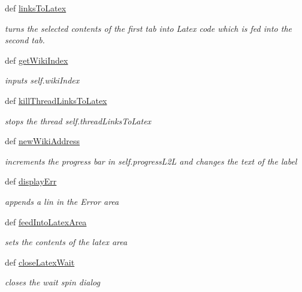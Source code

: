 \begin{DoxyCompactItemize}
def \hyperlink{classuicilibris_1_1w2mMainWindow_a1cfdfd4a9daf1a27d3d7f29cacb9f757}{links\-To\-Latex}
\begin{DoxyCompactList}\small\item\em turns the selected contents of the first tab into \-Latex code which is fed into the second tab. \end{DoxyCompactList}\item 
def \hyperlink{classuicilibris_1_1w2mMainWindow_a6717d417cd86ab78b4428a14b5ad4b0c}{get\-Wiki\-Index}
\begin{DoxyCompactList}\small\item\em inputs self.\-wiki\-Index \end{DoxyCompactList}\item 
def \hyperlink{classuicilibris_1_1w2mMainWindow_a3b1c79851802ee6bf2d49d77f779039f}{kill\-Thread\-Links\-To\-Latex}
\begin{DoxyCompactList}\small\item\em stops the thread self.\-thread\-Links\-To\-Latex \end{DoxyCompactList}\item 
def \hyperlink{classuicilibris_1_1w2mMainWindow_a1be02f4f12b50e5ebcd6ecc8f4d9a532}{new\-Wiki\-Address}
\begin{DoxyCompactList}\small\item\em increments the progress bar in self.\-progress\-L2\-L and changes the text of the label \end{DoxyCompactList}\item 
def \hyperlink{classuicilibris_1_1w2mMainWindow_a4f683d705e901227efacd4d3b59da2d7}{display\-Err}
\begin{DoxyCompactList}\small\item\em appends a lin in the \-Error area \end{DoxyCompactList}\item 
def \hyperlink{classuicilibris_1_1w2mMainWindow_ada098421fc13a62937c011086ce8f70a}{feed\-Into\-Latex\-Area}
\begin{DoxyCompactList}\small\item\em sets the contents of the latex area \end{DoxyCompactList}\item 
def \hyperlink{classuicilibris_1_1w2mMainWindow_afc484d21355b4e2bd6f729f6cdfcf5a0}{close\-Latex\-Wait}
\begin{DoxyCompactList}\small\item\em closes the wait spin dialog \end{DoxyCompactList}\item 

\end{DoxyCompactItemize}
